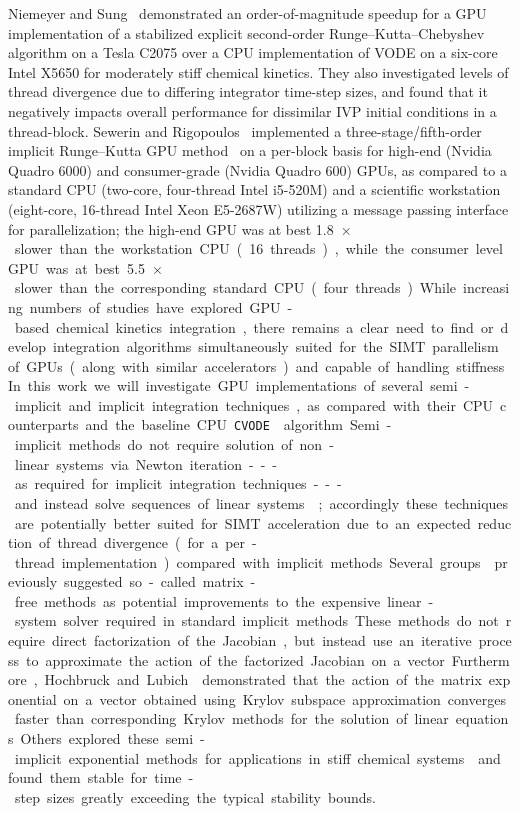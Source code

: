 \documentclass[preprint,review,11pt]{elsarticle}
\begin{document}
Niemeyer and Sung~\cite{Niemeyer:2014aa} demonstrated an order-of-magnitude speedup for a GPU implementation of a stabilized explicit second-order Runge--Kutta--Chebyshev algorithm on a Tesla C2075 over a CPU implementation of VODE on a six-core Intel X5650 for moderately stiff chemical kinetics.
They also investigated levels of thread divergence due to differing integrator time-step sizes, and found that it negatively impacts overall performance for dissimilar IVP initial conditions in a thread-block.
Sewerin and Rigopoulos~\cite{Sewerin20151375} implemented a three-stage\slash fifth-order implicit Runge--Kutta GPU method~\cite{wanner1991solving} on a per-block basis for high-end (Nvidia Quadro 6000) and consumer-grade (Nvidia Quadro 600) GPUs, as compared to a standard CPU (two-core, four-thread Intel i5-520M) and a scientific workstation (eight-core, 16-thread Intel Xeon E5-2687W) utilizing a message passing interface for parallelization; the high-end GPU was at best \SI{1.8}{$\times$} slower than the workstation CPU (16 threads), while the consumer level GPU was at best \SI{5.5}{$\times$} slower than the corresponding standard CPU (four threads).

While increasing numbers of studies have explored GPU-based chemical kinetics integration, there remains a clear need to find or develop integration algorithms simultaneously suited for the SIMT parallelism of GPUs (along with similar accelerators) and capable of handling stiffness.
In this work we will investigate GPU implementations of several semi-implicit and implicit integration techniques, as compared with their CPU counterparts and the baseline CPU \texttt{CVODE}~\cite{Hindmarsh:2005hg} algorithm.
Semi-implicit methods do not require solution of non-linear systems via Newton iteration---as required for implicit integration techniques---and instead solve sequences of linear systems~\cite{wanner1991solving}; accordingly these techniques are potentially better suited for SIMT acceleration due to an expected reduction of thread divergence (for a per-thread implementation) compared with implicit methods.

Several groups~\cite{Perini20141180,McNenly2015581} previously suggested so-called matrix-free methods as potential improvements to the expensive linear-system solver required in standard implicit methods.
These methods do not require direct factorization of the Jacobian, but instead use an iterative process to approximate the action of the factorized Jacobian on a vector.
Furthermore, Hochbruck and Lubich~\cite{Hochbruck:1997,Hochbruck:1998} demonstrated that the action of the matrix exponential on a vector obtained using Krylov subspace approximation converges faster than corresponding Krylov methods for the solution of linear equations.
Others explored these semi-implicit exponential methods for applications in stiff chemical systems~\cite{Bisetti:2012jw,falati2011integration} and found them stable for time-step sizes greatly exceeding the typical stability bounds.
\end{document}
